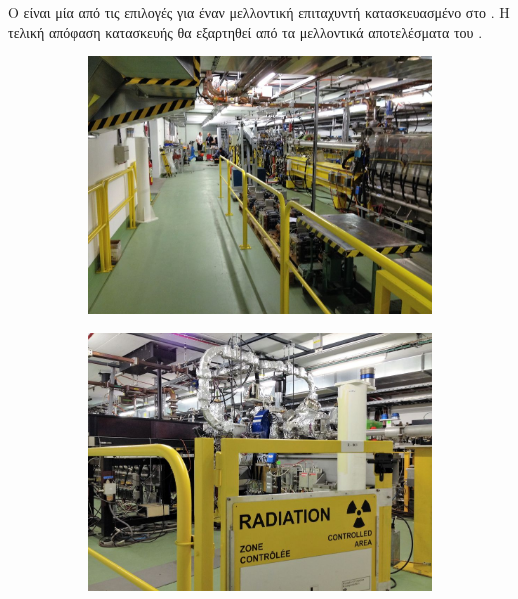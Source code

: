 Ο  είναι μία από τις επιλογές για έναν μελλοντική επιταχυντή κατασκευασμένο στο . 
Η τελική απόφαση κατασκευής θα εξαρτηθεί από τα μελλοντικά αποτελέσματα του .

\begin{figure}[tph]
	\centering
    \begin{subfigure}{0.47\textwidth}
		\centering
		\includegraphics[width=\linewidth]{images/CLIC-CTF3-overview}
    \end{subfigure}
	\hfill
    \begin{subfigure}{0.47\linewidth}
		\centering
		\includegraphics[width=\linewidth]{images/CLIC-CTF3-radiation}
    \end{subfigure}
	\par\bigskip

\end{figure}
